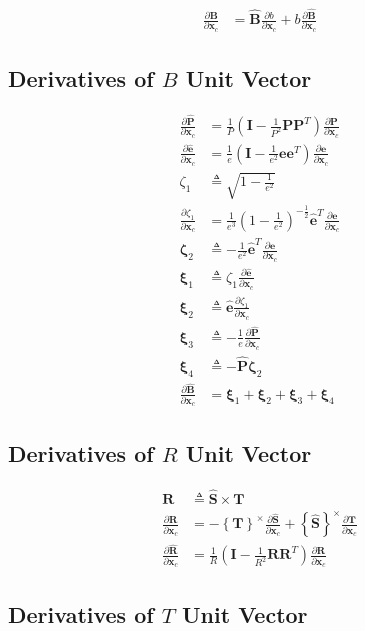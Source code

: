 \documentclass[]{article}
\newcommand{\vb}[1]{\bm{#1}} %
\newcommand{\vbh}[1]{\hat{\bm{#1}}} %
\newcommand{\pd}[2]{\frac{\partial #1}{\partial #2}} %
\newcommand{\crossmat}[1]{\left\{ {#1} \right\}^{\times}} %
\newcommand{\xc}[0]{\vb{x}_c}
\begin{document}
\begin{align}
	\pd{\vb{B}}{\xc} &= \vbh{B} \pd{b}{\xc} + b \pd{\vbh{B}}{\xc}
\end{align}

\subsection{Derivatives of $B$ Unit Vector}
\label{sec:cartesian2bplanejac_bunit}

\begin{align}
	\pd{\vbh{P}}{\xc} &= \frac{1}{P} \left( \vb{I} - \frac{1}{P^2} \vb{P} \vb{P}^T \right) \pd{\vb{P}}{\xc} \\
	\pd{\vbh{e}}{\xc} &= \frac{1}{e} \left( \vb{I} - \frac{1}{e^2} \vb{e} \vb{e}^T \right) \pd{\vb{e}}{\xc} \\
	\zeta_1 &\triangleq \sqrt{1 - \frac{1}{e^2}} \\
	\pd{\zeta_1}{\xc} &= \frac{1}{e^3} \left( 1 - \frac{1}{e^2} \right)^{-\frac{1}{2}} \vbh{e}^T \pd{\vb{e}}{\xc} \\
	\vb{\zeta}_2 &\triangleq -\frac{1}{e^2} \vbh{e}^T \pd{\vb{e}}{\xc} \\
	\vb{\xi}_1 &\triangleq \zeta_1 \pd{\vbh{e}}{\xc} \\
	\vb{\xi}_2 &\triangleq \vbh{e} \pd{\zeta_1}{\xc} \\
	\vb{\xi}_3 &\triangleq -\frac{1}{e} \pd{\vbh{P}}{\xc} \\
	\vb{\xi}_4 &\triangleq - \vbh{P} \vb{\zeta}_2 \\
	\label{eq:d_bunit_d_xc_in}
	\pd{\vbh{B}}{\xc} &= \vb{\xi}_1 + \vb{\xi}_2 + \vb{\xi}_3 + \vb{\xi}_4
\end{align}

\subsection{Derivatives of $R$ Unit Vector}

\begin{align}
	\vb{R} &\triangleq \vbh{S} \times \vb{T} \\
	\pd{\vb{R}}{\xc} &= -\crossmat{\vb{T}} \pd{\vbh{S}}{\xc} + \crossmat{\vbh{S}} \pd{\vb{T}}{\xc} \\
	\pd{\vbh{R}}{\xc} &= \frac{1}{R} \left( \vb{I} - \frac{1}{R^2} \vb{R} \vb{R}^T \right) \pd{\vb{R}}{\xc}
\end{align}

\subsection{Derivatives of $T$ Unit Vector}
\end{document}
